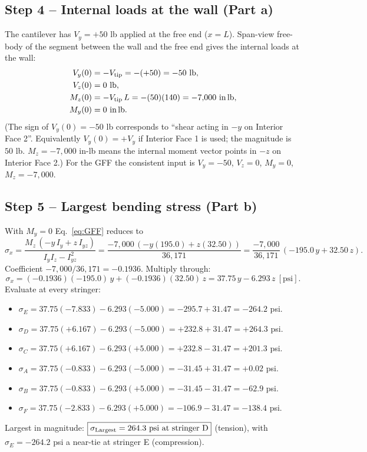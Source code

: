 \documentclass[11pt]{article}
\begin{document}
\subsection*{Step 4 -- Internal loads at the wall (Part a)}

The cantilever has $V_y = +50$ lb applied at the free end ($x = L$). Span-view free-body of the segment between the wall and the free end gives the internal loads at the wall:
\begin{align*}
V_y(0) &= -V_{\rm tip} = -(+50) = -50\ \text{lb},\\
V_z(0) &= 0\ \text{lb},\\
M_z(0) &= -V_{\rm tip}\, L = -(50)(140) = -7{,}000\ \text{in\,lb},\\
M_y(0) &= 0\ \text{in\,lb}.
\end{align*}
(The sign of $V_y(0) = -50$ lb corresponds to ``shear acting in $-y$ on Interior Face 2''. Equivalently $V_y(0) = +V_y$ if Interior Face 1 is used; the magnitude is $50$ lb. $M_z = -7{,}000$ in-lb means the internal moment vector points in $-z$ on Interior Face 2.) For the GFF the consistent input is $V_y = -50$, $V_z = 0$, $M_y = 0$, $M_z = -7{,}000$.

\subsection*{Step 5 -- Largest bending stress (Part b)}

With $M_y = 0$ Eq.~\eqref{eq:GFF} reduces to
$$\sigma_x = \frac{M_z\,(-y\,I_y + z\,I_{yz})}{I_y I_z - I_{yz}^2} = \frac{-7{,}000\,(-y(195.0) + z(32.50))}{36{,}171} = \frac{-7{,}000}{36{,}171}\,(-195.0\,y + 32.50\,z).$$
Coefficient $-7{,}000 / 36{,}171 = -0.1936$. Multiply through:
$$\sigma_x = (-0.1936)(-195.0)\,y + (-0.1936)(32.50)\,z = 37.75\,y - 6.293\,z\ [\text{psi}].$$
Evaluate at every stringer:
\begin{itemize}[leftmargin=2em, itemsep=0pt]
  \item $\sigma_E = 37.75(-7.833) - 6.293(-5.000) = -295.7 + 31.47 = -264.2$ psi.
  \item $\sigma_D = 37.75(+6.167) - 6.293(-5.000) = +232.8 + 31.47 = +264.3$ psi.
  \item $\sigma_C = 37.75(+6.167) - 6.293(+5.000) = +232.8 - 31.47 = +201.3$ psi.
  \item $\sigma_A = 37.75(-0.833) - 6.293(-5.000) = -31.45 + 31.47 = +0.02$ psi.
  \item $\sigma_B = 37.75(-0.833) - 6.293(+5.000) = -31.45 - 31.47 = -62.9$ psi.
  \item $\sigma_F = 37.75(-2.833) - 6.293(+5.000) = -106.9 - 31.47 = -138.4$ psi.
\end{itemize}
Largest in magnitude: $\boxed{\sigma_{\rm Largest} = 264.3\ \text{psi at stringer D}}$ (tension), with $\sigma_E = -264.2$ psi a near-tie at stringer E (compression).
\end{document}

